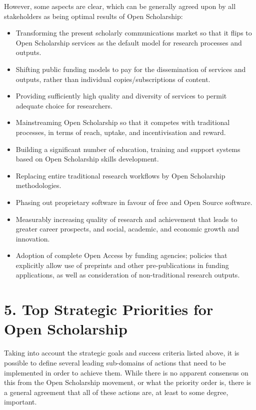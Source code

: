 However, some aspects are clear, which can be generally agreed upon by
all stakeholders as being optimal results of Open Scholarship:

\begin{itemize}
\item
  Transforming the present scholarly communications market so that it
  flips to Open Scholarship services as the default model for research
  processes and outputs.
\item
  Shifting public funding models to pay for the dissemination of
  services and outputs, rather than individual copies/subscriptions of
  content.
\item
  Providing sufficiently high quality and diversity of services to
  permit adequate choice for researchers.
\item
  Mainstreaming Open Scholarship so that it competes with traditional
  processes, in terms of reach, uptake, and incentivisation and reward.
\item
  Building a significant number of education, training and support
  systems based on Open Scholarship skills development.
\item
  Replacing entire traditional research workflows by Open Scholarship
  methodologies.
\item
  Phasing out proprietary software in favour of free and Open Source
  software.
\item
  Measurably increasing quality of research and achievement that leads
  to greater career prospects, and social, academic, and economic growth
  and innovation.
\item
  Adoption of complete Open Access by funding agencies; policies that
  explicitly allow use of preprints and other pre-publications in
  funding applications, as well as consideration of non-traditional
  research outputs.
\end{itemize}

\section{5. Top Strategic Priorities for Open Scholarship
}\label{top-strategic-priorities-for-open-scholarship}

Taking into account the strategic goals and success criteria listed
above, it is possible to define several leading sub-domains of actions
that need to be implemented in order to achieve them. While there is no
apparent consensus on this from the Open Scholarship movement, or what
the priority order is, there is a general agreement that all of these
actions are, at least to some degree, important.

